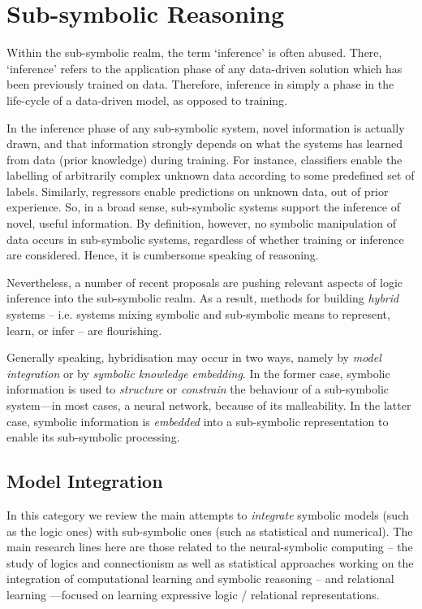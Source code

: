 \documentclass[12pt,a4paper,openright,twoside]{book}
\begin{document}
\section{Sub-symbolic Reasoning}
%

Within the sub-symbolic realm, the term `inference' is often abused.
%
There, `inference' refers to the application phase of any data-driven solution which has been previously trained on data.
%
Therefore, inference in simply a phase in the life-cycle of a data-driven model, as opposed to training.

In the inference phase of any sub-symbolic system, novel information is actually drawn, and that information strongly depends on what the systems has learned from data (prior knowledge) during training.
%
For instance, classifiers enable the labelling of arbitrarily complex unknown data according to some predefined set of labels.
%
Similarly, regressors enable predictions on unknown data, out of prior experience.
%
So, in a broad sense, sub-symbolic systems support the inference of novel, useful information.
%
By definition, however, no symbolic manipulation of data occurs in sub-symbolic systems, regardless of whether training or inference are considered.
%
Hence, it is cumbersome speaking of reasoning.

Nevertheless, a number of recent proposals are pushing relevant aspects of logic inference into the sub-symbolic realm.
%
As a result, methods for building \emph{hybrid} systems -- i.e. systems mixing symbolic and sub-symbolic means to represent, learn, or infer -- are flourishing.

Generally speaking, hybridisation may occur in two ways, namely by \emph{model integration} or by \emph{symbolic knowledge embedding}.
%
In the former case, symbolic information is used to \emph{structure} or \emph{constrain} the behaviour of a sub-symbolic system---in most cases, a neural network, because of its malleability.
%
In the latter case, symbolic information is \emph{embedded} into a sub-symbolic representation to enable its sub-symbolic processing.

\subsection{Model Integration}\label{ssec:model-integration}

In this category we review the main attempts to \emph{integrate} symbolic models (such as the logic ones) with sub-symbolic ones (such as statistical and numerical).
%
The main research lines here are those related to the neural-symbolic computing \cite{Hammer2007-neuralsymbolic}  -- the study of logics and connectionism as well as statistical approaches working on the integration of computational learning and symbolic reasoning -- and relational learning \cite{deRaedt2008-logicalRL}---focused on learning expressive logic / relational representations.
\end{document}
